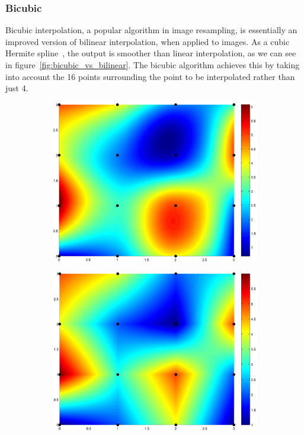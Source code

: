         \subsubsection{Bicubic}\label{background_interpolation_methods_bicubic}

            Bicubic interpolation, a popular algorithm in image resampling, is essentially an improved version of bilinear interpolation, when applied to images. As a cubic Hermite spline~\cite{practicalguidesplines}, the output is smoother than linear interpolation, as we can see in figure~\ref{fig:bicubic_vs_bilinear}. The bicubic algorithm achieves this by taking into account the 16 points surrounding the point to be interpolated rather than just 4. 

            \begin{figure}[H]
                \centering
                \begin{subfigure}{.5\textwidth}
                    \centering
                    \includegraphics[width=0.9\linewidth]{./images/Bicubic_Interpolation_Example.png}
                    \caption{}
                    \label{fig:example_bicubic}
                \end{subfigure}%
                \begin{subfigure}{.5\textwidth}
                    \includegraphics[width=0.9\linewidth]{./images/Bilinear_Interpolation_Example.png}

\end{subfigure}
\end{figure}
